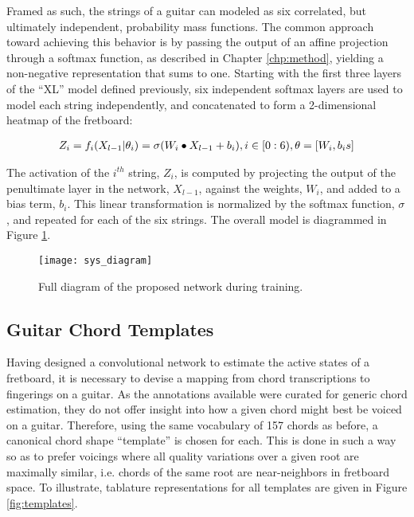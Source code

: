 Framed as such, the strings of a guitar can modeled as six correlated, but ultimately independent, probability mass functions.
The common approach toward achieving this behavior is by passing the output of an affine projection through a softmax function, as described in Chapter \ref{chp:method}, yielding a non-negative representation that sums to one.
Starting with the first three layers of the ``XL'' model defined previously, six independent softmax layers are used to model each string independently, and concatenated to form a 2-dimensional heatmap of the fretboard:

\begin{align*}
\label{eq:softmax_layer}
\small
Z_i = f_i(X_{l-1} \vert \theta_i) = \sigma (W_i \bullet X_{l-1} + b_i), i \in [0:6), \theta = [W_i, b_is]
\end{align*}

\noindent The activation of the $i^{th}$ string, $Z_i$, is computed by projecting the output of the penultimate layer in the network, $X_{l-1}$, against the weights, $W_i$, and added to a bias term, $b_i$.
This linear transformation is normalized by the softmax function, $\sigma$, and repeated for each of the six strings.
The overall model is diagrammed in Figure \ref{fig:guitarnet}.


\begin{figure}[t!]
  \centering
  \centerline{\texttt{[image: sys\_diagram]}}
\caption{Full diagram of the proposed network during training.}
\label{fig:guitarnet}
%
\end{figure}


\subsection{Guitar Chord Templates}
\label{subsec:vocabulary}

Having designed a convolutional network to estimate the active states of a fretboard, it is necessary to devise a mapping from chord transcriptions to fingerings on a guitar.
As the annotations available were curated for generic chord estimation, they  do not offer insight into how a given chord might best be voiced on a guitar.
Therefore, using the same vocabulary of 157 chords as before, a canonical chord shape ``template'' is chosen for each.
This is done in such a way so as to prefer voicings where all quality variations over a given root are maximally similar, i.e. chords of the same root are near-neighbors in fretboard space.
To illustrate, tablature representations for all templates are given in Figure \ref{fig:templates}.


